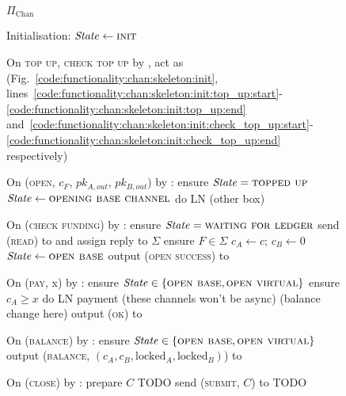 \begin{figure}[H]
  \begin{protocolbox}{$\Pi_{\mathrm{Chan}}$}
    \begin{algorithmic}[1]
      \State Initialisation:
      \Indent
        \State $\mathit{State} \gets \textsc{init}$
      \EndIndent
      \Statex

      \State On \textsc{top up}, \textsc{check top up} by \environment, act as
      \fchan (Fig.~\ref{code:functionality:chan:skeleton:init},
      lines~\ref{code:functionality:chan:skeleton:init:top_up:start}-\ref{code:functionality:chan:skeleton:init:top_up:end}
      and~\ref{code:functionality:chan:skeleton:init:check_top_up:start}-\ref{code:functionality:chan:skeleton:init:check_top_up:end}
      respectively)
      \Statex

      \State On (\textsc{open}, $c_F$, $pk_{A, out}$, $pk_{B, out}$) by
      \environment:
      \Indent
        \State ensure $\mathit{State} = \textsc{topped up}$
        \State $\mathit{State} \gets \textsc{opening base channel}$
        \State do LN (other box) %
      \EndIndent
      \Statex

      \State On (\textsc{check funding}) by \environment:
      \Indent
        \State ensure $\mathit{State} = \textsc{waiting for ledger}$
        \State send (\textsc{read}) to \ledger and assign reply to $\Sigma$
        \State ensure $F \in \Sigma$
        \State $c_A \gets c$; $c_B \gets 0$ 
        \State $\mathit{State} \gets \textsc{open base}$
        \State output (\textsc{open success}) to \environment
      \EndIndent
      \Statex

      \State On (\textsc{pay}, x) by \environment:
      \Indent
        \State ensure $\mathit{State} \in \{\textsc{open base}, \textsc{open
        virtual}\}$
        \State ensure $c_A \geq x$
        \State do LN payment (these channels won't be async) (balance change
        here) %
        \State output (\textsc{ok}) to \environment
      \EndIndent
      \Statex

      \State On (\textsc{balance}) by \environment:
      \Indent
        \State ensure $\mathit{State} \in \{\textsc{open base}, \textsc{open
        virtual}\}$
        \State output (\textsc{balance}, $(c_A, c_B, \mathrm{locked}_A,
        \mathrm{locked}_B)$) to \environment %
      \EndIndent
      \Statex

      \State On (\textsc{close}) by \environment:
      \Indent
          \State prepare $C$ TODO
          \State send (\textsc{submit}, $C$) to \ledger
          \State TODO
        \EndIf
      \EndIndent
    \end{algorithmic}
  \end{protocolbox}
  \caption{}
  \label{code:protocol:chan:skeleton}
\end{figure}

